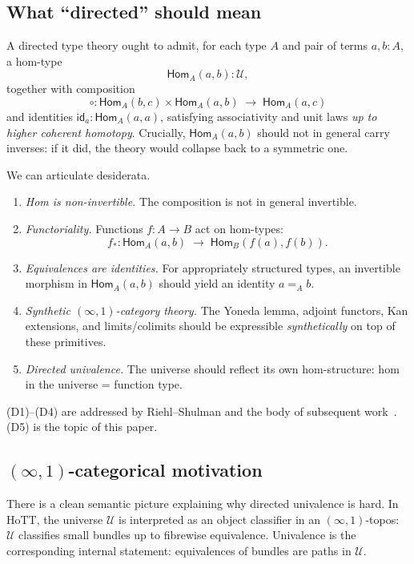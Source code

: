 \documentclass[12pt]{article}
\theoremstyle{definition}
\theoremstyle{remark}
\newcommand{\U}{\mathcal{U}}
\newcommand{\Hom}{\mathsf{Hom}}
\newcommand{\id}{\mathsf{id}}
\begin{document}
\subsection{What ``directed'' should mean}

A directed type theory ought to admit, for each type $A$ and pair of terms $a, b : A$, a hom-type
\[
\Hom_A(a, b) : \U,
\]
together with composition
\[
\circ : \Hom_A(b,c) \times \Hom_A(a,b) \;\longrightarrow\; \Hom_A(a,c)
\]
and identities $\id_a : \Hom_A(a,a)$, satisfying associativity and unit laws \emph{up to higher coherent homotopy}. Crucially, $\Hom_A(a,b)$ should not in general carry inverses: if it did, the theory would collapse back to a symmetric one.

We can articulate desiderata.

\begin{enumerate}
\item[(D1)] \emph{Hom is non-invertible.} The composition is not in general invertible.
\item[(D2)] \emph{Functoriality.} Functions $f : A \to B$ act on hom-types:
\[
f_*: \Hom_A(a,b) \;\longrightarrow\; \Hom_B(f(a),f(b)).
\]
\item[(D3)] \emph{Equivalences are identities.} For appropriately structured types, an invertible morphism in $\Hom_A(a,b)$ should yield an identity $a =_A b$.
\item[(D4)] \emph{Synthetic $(\infty,1)$-category theory.} The Yoneda lemma, adjoint functors, Kan extensions, and limits/colimits should be expressible \emph{synthetically} on top of these primitives.
\item[(D5)] \emph{Directed univalence.} The universe should reflect its own hom-structure: hom in the universe = function type.
\end{enumerate}

(D1)--(D4) are addressed by Riehl--Shulman and the body of subsequent work~\cite{RiehlShulman,Buchholtz,Cisinski,KavvosWeaver}. (D5) is the topic of this paper.

\subsection{\texorpdfstring{$(\infty,1)$-categorical motivation}{(infinity,1)-categorical motivation}}

There is a clean semantic picture explaining why directed univalence is hard. In HoTT, the universe $\U$ is interpreted as an object classifier in an $(\infty,1)$-topos: $\U$ classifies small bundles up to fibrewise equivalence. Univalence is the corresponding internal statement: equivalences of bundles are paths in $\U$.
\end{document}
